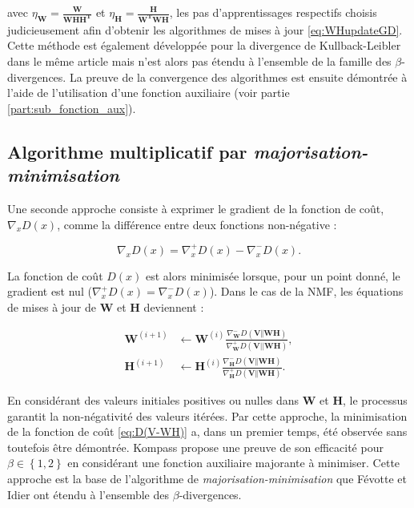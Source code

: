 avec $\eta_{\mathbf{W}} = \frac{\mathbf{W}}{\mathbf{WHH^T}}$ et $\eta_{\mathbf{H}} = \frac{\mathbf{H}}{\mathbf{W^TWH}}$, les pas d'apprentissages respectifs choisis judicieusement afin d'obtenir les algorithmes de mises à jour \ref{eq:WHupdateGD}. Cette méthode est également développée pour la divergence de Kullback-Leibler dans le même article mais n'est alors pas étendu à l'ensemble de la famille des $\beta$-divergences. La preuve de la convergence des algorithmes est ensuite démontrée à l'aide de l'utilisation d'une fonction auxiliaire (voir partie \ref{part:sub_fonction_aux}).


\subsection{Algorithme multiplicatif par \textit{majorisation-minimisation}}\label{part:majorisation-minimisation}
Une seconde approche \cite{cichocki2006csiszar} consiste à exprimer le gradient de la fonction de coût, $\nabla_x D(x)$, comme la différence entre deux fonctions non-négative :

\begin{equation}
\nabla_x D(x) = \nabla_x^+ D(x) - \nabla_x^- D(x).
\end{equation}

La fonction de coût $D(x)$ est alors minimisée lorsque, pour un point donné, le gradient est nul ($\nabla_x^+ D(x) = \nabla_x^- D(x)$). Dans le cas de la NMF, les équations de mises à jour de $\mathbf{W}$ et $\mathbf{H}$ deviennent :

\begin{subequations}
    \begin{align}
     \mathbf{W}^{(i+1)} & \leftarrow \mathbf{W}^{(i)}\frac{\nabla_\mathbf{W}^-D(\mathbf{V}\Vert\mathbf{WH})}{\nabla_\mathbf{W}^+D(\mathbf{V}\vert \vert \mathbf{WH})},\\
     \mathbf{H}^{(i+1)} & \leftarrow \mathbf{H}^{(i)}\frac{\nabla_\mathbf{H}^-D(\mathbf{V}\Vert\mathbf{WH})}{\nabla_\mathbf{H}^+D(\mathbf{V}\Vert\mathbf{WH})}.
    \end{align}
\end{subequations}

En considérant des valeurs initiales positives ou nulles dans $\mathbf{W}$ et $\mathbf{H}$, le processus garantit la non-négativité des valeurs itérées. Par cette approche, la minimisation de la fonction de coût \ref{eq:D(V-WH)} a, dans un premier temps, été observée sans toutefois être démontrée. Kompass \cite{kompass_generalized_2007} propose une preuve de son efficacité pour $\beta \in \left\lbrace1,2 \right\rbrace$ en considérant une fonction auxiliaire majorante à minimiser. Cette approche est la base de l'algorithme de \textit{majorisation-minimisation} que Févotte et Idier \cite{fevotte_algorithms_2011} ont étendu à l'ensemble des $\beta$-divergences.

